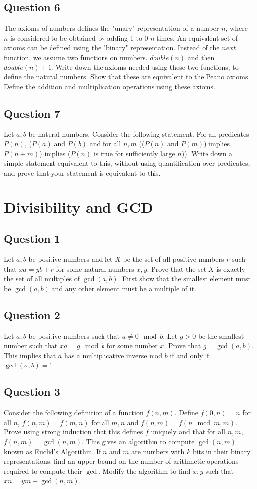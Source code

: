 \documentclass[12pt]{report}
\begin{document}
\section*{Question 6}
The axioms of numbers defines the "unary" representation of a number $n$, where $n$ is considered to be obtained by adding 1 to 0 $n$ times.  An equivalent set of axioms can be defined using the "binary" representation. Instead of the $next$ function, we assume two functions on numbers, $double(n)$ and then $double(n) + 1$. Write down the axioms needed using these two functions, to define the natural numbers. Show that these are equivalent to the Peano
axioms. Define the addition and multiplication operations using these axioms.
\section*{Question 7}
Let $a, b$ be natural numbers. Consider the following statement. For all predicates $P(n)$, ($P(a)$ and $P(b)$ and for all $n, m$ (($P(n)$ and $P(m)$) implies $P(n + m)$) implies ($P(n)$ is true for sufficiently large $n$)).  Write down a simple statement equivalent to this, without using quantification over predicates, and prove that your statement is equivalent to this.
\chapter{Divisibility and GCD}
\section*{Question 1}
Let $a, b$ be positive numbers and let $X$ be the set of all positive numbers $r$ such that $xa = yb + r$ for some natural numbers $x, y$. Prove that the set $X$ is exactly the set of all multiples of $\gcd(a, b)$. First show that the smallest element must be $\gcd(a, b)$ and any other element must be a multiple of it.
\section*{Question 2}
Let $a, b$ be positive numbers such that $a \neq 0 \mod b$. Let $g > 0$ be the smallest number such that $xa = g \mod b$ for some number $x$. Prove that $g = \gcd(a, b)$. This implies that $a$ has a multiplicative inverse mod $b$ if and only if $\gcd(a, b) = 1$.
\section*{Question 3}
Consider the following definition of a function $f(n, m)$. Define $f(0, n) = n$ for all $n$, $f(n, m) = f(m, n)$ for all $m, n$ and $f(n, m) = f(n \mod m, m)$. Prove using strong induction that this defines $f$ uniquely and that for all $n, m$, $f(n, m) = \gcd(n, m)$. This gives an algorithm to compute $\gcd(n, m)$ known as Euclid's Algorithm. If $n$ and $m$ are numbers with $k$ bits in their binary representations, find an upper bound on the number of arithmetic operations required to compute their $\gcd$. Modify the algorithm to find $x, y$ such that $xn = ym + \gcd(n, m)$.
\end{document}
